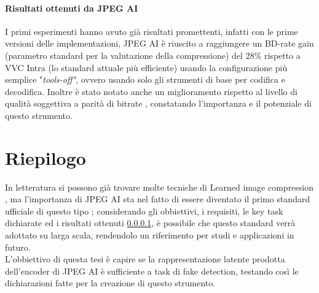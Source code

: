 \paragraph{Risultati ottenuti da JPEG AI}\label{par:riep}
I primi esperimenti hanno avuto già risultati promettenti, infatti con le prime versioni delle implementazioni, JPEG AI è riuscito a raggiungere un BD-rate gain (parametro standard per la valutazione della compressione) del 28\% \cite{ascenso2023jpegAI}  rispetto a VVC Intra (lo standard attuale più efficiente) usando la configurazione più semplice "\textit{tools-off"}, ovvero usando solo gli strumenti di base per codifica e decodifica. Inoltre è stato notato anche un miglioramento rispetto al livello di qualità soggettiva a parità di bitrate \cite{ascenso2023jpegAI}, constatando l'importanza e il potenziale di questo strumento.
\section{Riepilogo}
In letteratura si possono già trovare molte tecniche di Learned image compression \cite{ascenso2019report}, ma l'importanza di JPEG AI  sta nel fatto di essere diventato il primo standard ufficiale di questo tipo \cite{JPEG106thMeeting}; considerando  gli obbiettivi, i requisiti, le key task dichiarate ed i risultati ottenuti \ref{par:riep}, è possibile che questo standard verrà adottato su larga scala, rendendolo un riferimento per studi e applicazioni in futuro.\\
L'obbiettivo di questa tesi è capire se la rappresentazione latente prodotta dell'encoder di JPEG AI è sufficiente a task di fake detection, testando così le dichiarazioni fatte per la creazione di questo strumento.

